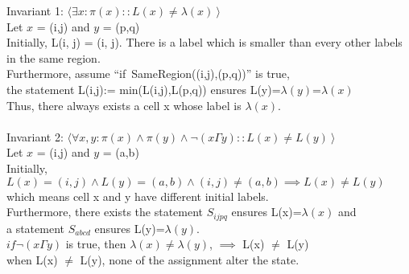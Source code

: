\documentclass{article}
\begin{document}
Invariant 1: $\langle \exists x: \pi(x) :: L(x) \neq \lambda(x) \ \rangle$ \\
Let $x$ = (i,j)  and $y$ = (p,q)\\
Initially, L(i, j) = (i, j). There is a label which is smaller than every other labels in the same region.\\
Furthermore, assume ``if\ SameRegion((i,j),(p,q))'' is true,\\
the statement L(i,j):= min(L(i,j),L(p,q)) ensures L(y)=$\lambda(y)$=$\lambda(x)$\\
Thus, there always exists a cell x whose label is $\lambda(x)$.\\
\\
Invariant 2: $\langle \forall x,y: \pi(x) \wedge \pi(y) \wedge \neg(x \Gamma y) :: L(x) \neq L(y) \ \rangle$ \\
Let $x$ = (i,j)  and $y$ = (a,b)\\
Initially, $L(x) = (i,j) \wedge L(y) = (a,b) \wedge (i,j)\neq(a,b) \implies L(x) \neq L(y)$\\
which means cell x and y have different initial labels.\\
Furthermore, there exists the statement $S_{ijpq}$ ensures L(x)=$\lambda(x)$ and\\a statement $S_{abcd}$ ensures L(y)=$\lambda(y)$.\\
$if \neg(x \Gamma y)$ is true, then $\lambda(x)$$\neq$$\lambda(y)$, $\implies$ L(x) $\neq$ L(y)\\
when L(x) $\neq$ L(y), none of the assignment alter the state.\\
\end{document}
